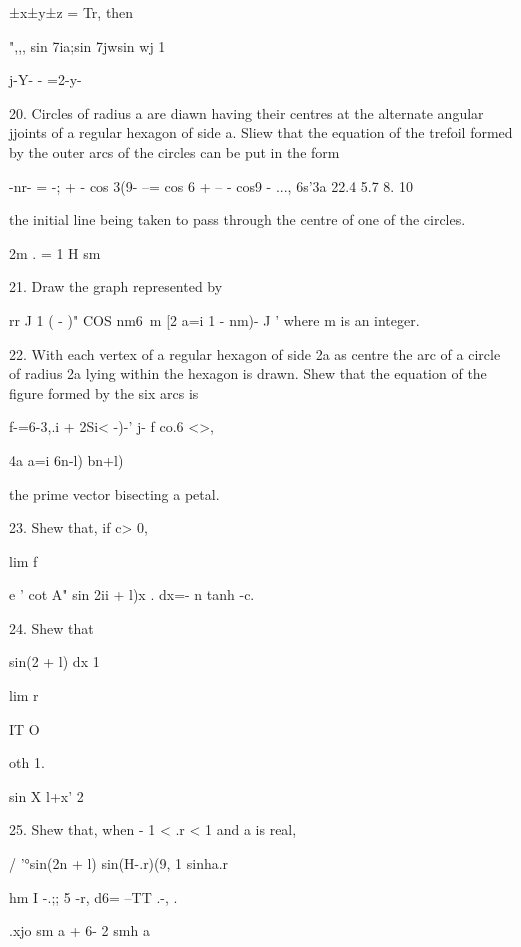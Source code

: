 ±x±y±z = Tr, then

",,, sin 7ia;sin 7jwsin wj 1

 j-Y- - =2-y-


20. Circles of radius a are diawn having their centres at the
alternate angular jjoints of a regular hexagon of side a. Sliew that
the equation of the trefoil formed by the outer arcs of the circles
can be put in the form

-nr- = -; + - cos 3(9- --= cos 6 + -- - cos9 - ..., 6s'3a 22.4 5.7 8.
10

the initial line being taken to pass through the centre of one of the
circles.


2m . = 1 H sm

%
%

21. Draw the graph represented by

rr J 1 ( - )" COS nm6\ m [2 a=i 1 - nm)- J ' where m is an integer.

22. With each vertex of a regular hexagon of side 2a as centre the arc
of a circle of radius 2a lying within the hexagon is drawn. Shew that
the equation of the figure formed by the six arcs is

f-=6-3,.i + 2Si< -)-' j- f co.6 <>,

4a a=i 6n-l) bn+l)

the prime vector bisecting a petal. 

23. Shew that, if c> 0,

lim f

e ' cot A" sin 2ii + l)x . dx=- n tanh -c\pi.


24. Shew that

sin(2 + l) dx 1

lim r

IT O

oth 1.


sin X l+x' 2

25. Shew that, when - 1 < .r < 1 and a is real,

/ '°sin(2n + l) sin(H-.r)(9, 1 sinha.r

hm I -.;; 5 -r, d6= --TT .-, .

  .xjo sm a + 6- 2 smh a

